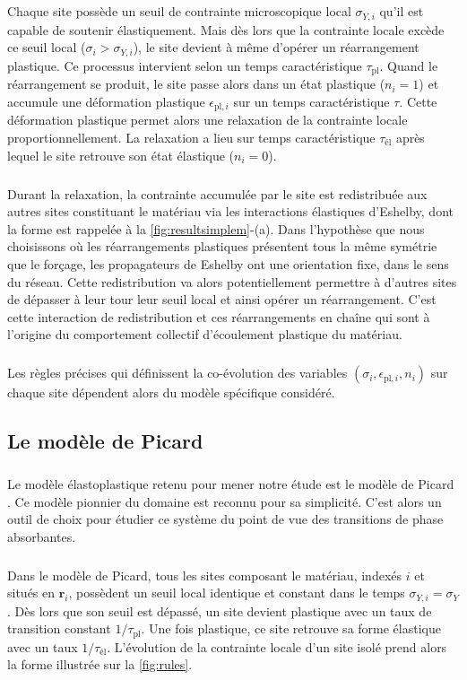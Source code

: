\subparagraph{}Chaque site possède un seuil de contrainte microscopique local $\sigma_{Y,i}$ qu'il est capable de soutenir élastiquement. Mais dès lors que la contrainte locale excède ce seuil local ($\sigma_i > \sigma_{Y,i}$), le site devient à même d'opérer un réarrangement plastique. Ce processus intervient selon un temps caractéristique $\tau_{\text{pl}}$. Quand le réarrangement se produit, le site passe alors dans un état plastique ($n_i = 1$) et accumule une déformation plastique $\epsilon_{\text{pl},i}$ sur un temps caractéristique $\tau$. Cette déformation plastique permet alors une relaxation de la contrainte locale proportionnellement. La relaxation a lieu sur temps caractéristique $\tau_{\text{él}}$ après lequel le site retrouve son état élastique ($n_i = 0$).

\subparagraph{}Durant la relaxation, la contrainte accumulée par le site est redistribuée aux autres sites constituant le matériau via les interactions élastiques d'Eshelby, dont la forme est rappelée à la \autoref{fig:resultsimplem}-(a). Dans l'hypothèse que nous choisissons où les réarrangements plastiques présentent tous la même symétrie que le forçage, les propagateurs de Eshelby ont une orientation fixe, dans le sens du réseau. Cette redistribution va alors potentiellement permettre à d'autres sites de dépasser à leur tour leur seuil local et ainsi opérer un réarrangement. C'est cette interaction de redistribution et ces réarrangements en chaîne qui sont à l'origine du comportement collectif d'écoulement plastique du matériau.

\subparagraph{}Les règles précises qui définissent la co-évolution des variables $(\sigma_i, \epsilon_{\text{pl},i}, n_i)$ sur chaque site dépendent alors du modèle spécifique considéré.

\subsection{Le modèle de Picard}

\subparagraph{}Le modèle élastoplastique retenu pour mener notre étude est le modèle de Picard \cite{picard_slow_2005}. Ce modèle pionnier du domaine est reconnu pour sa simplicité. C'est alors un outil de choix pour étudier ce système du point de vue des transitions de phase absorbantes.

\subparagraph{}Dans le modèle de Picard, tous les sites composant le matériau, indexés $i$ et situés en $\mathbf{r}_i$, possèdent un seuil local identique et constant dans le temps $\sigma_{Y,i}=\sigma_Y$. Dès lors que son seuil est dépassé, un site devient plastique avec un taux de transition constant $1/\tau_ {\text{pl}}$. Une fois plastique, ce site retrouve sa forme élastique avec un taux $1/\tau_ {\text{él}}$. L'évolution de la contrainte locale d'un site isolé prend alors la forme illustrée sur la \autoref{fig:rules}.

